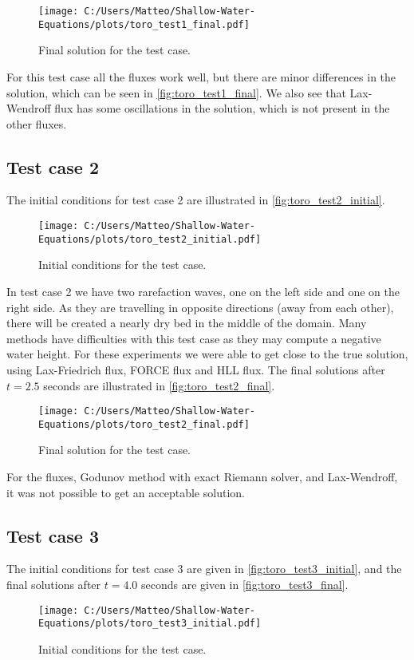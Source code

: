 \begin{figure}[H]
    \centering
    \texttt{[image: C:/Users/Matteo/Shallow-Water-Equations/plots/toro\_test1\_final.pdf]}
    \caption{Final solution for the test case.}\label{fig:toro_test1_final}
\end{figure}
For this test case all the fluxes work well, but there are minor differences in the solution, which can be seen in \autoref{fig:toro_test1_final}.
We also see that Lax-Wendroff flux has some oscillations in the solution, which is not present in the other fluxes.

\subsection*{Test case 2}
The initial conditions for test case 2 are illustrated in \autoref{fig:toro_test2_initial}.
\begin{figure}[H]
    \centering
    \texttt{[image: C:/Users/Matteo/Shallow-Water-Equations/plots/toro\_test2\_initial.pdf]}
    \caption{Initial conditions for the test case.}\label{fig:toro_test2_initial}
\end{figure}
In test case 2 we have two rarefaction waves, one on the left side and one on the right side.
As they are travelling in opposite directions (away from each other), there will be created a nearly dry bed in the middle of the domain.
Many methods have difficulties with this test case as they may compute a negative water height.
For these experiments we were able to get close to the true solution, using Lax-Friedrich flux, FORCE flux and HLL flux.
The final solutions after $t=2.5$ seconds are illustrated in \autoref{fig:toro_test2_final}.
\begin{figure}[H]
    \centering
    \texttt{[image: C:/Users/Matteo/Shallow-Water-Equations/plots/toro\_test2\_final.pdf]}
    \caption{Final solution for the test case.}\label{fig:toro_test2_final}
\end{figure}
For the fluxes, Godunov method with exact Riemann solver, and Lax-Wendroff, it was not possible to get an acceptable solution.

\subsection*{Test case 3}
The initial conditions for test case 3 are given in \autoref{fig:toro_test3_initial}, and the final solutions after $t=4.0$ seconds are given in \autoref{fig:toro_test3_final}.
\begin{figure}[H]
    \centering
    \texttt{[image: C:/Users/Matteo/Shallow-Water-Equations/plots/toro\_test3\_initial.pdf]}
    \caption{Initial conditions for the test case.}\label{fig:toro_test3_initial}
\end{figure}

